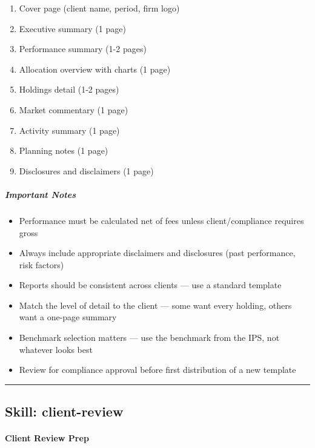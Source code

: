 \documentclass[11pt]{article}
\begin{document}
\begin{enumerate}[leftmargin=*,itemsep=2pt,topsep=2pt]
\item {} Cover page (client name, period, firm logo)
\item {} Executive summary (1 page)
\item {} Performance summary (1-2 pages)
\item {} Allocation overview with charts (1 page)
\item {} Holdings detail (1-2 pages)
\item {} Market commentary (1 page)
\item {} Activity summary (1 page)
\item {} Planning notes (1 page)
\item {} Disclosures and disclaimers (1 page)
\end{enumerate}

\subparagraph{Important Notes}\mbox{}\par

\begin{itemize}[leftmargin=*,itemsep=2pt,topsep=2pt]
\item {} Performance must be calculated net of fees unless client/compliance requires gross
\item {} Always include appropriate disclaimers and disclosures (past performance, risk factors)
\item {} Reports should be consistent across clients — use a standard template
\item {} Match the level of detail to the client — some want every holding, others want a one-page summary
\item {} Benchmark selection matters — use the benchmark from the IPS, not whatever looks best
\item {} Review for compliance approval before first distribution of a new template
\end{itemize}

\vspace{0.8em}\hrule\vspace{0.8em}

\subsection{Skill: client-review}\label{file:meeting-prep-agent-skills-client-review-SKILL-md}

\paragraph{Client Review Prep}\mbox{}\par
\end{document}
